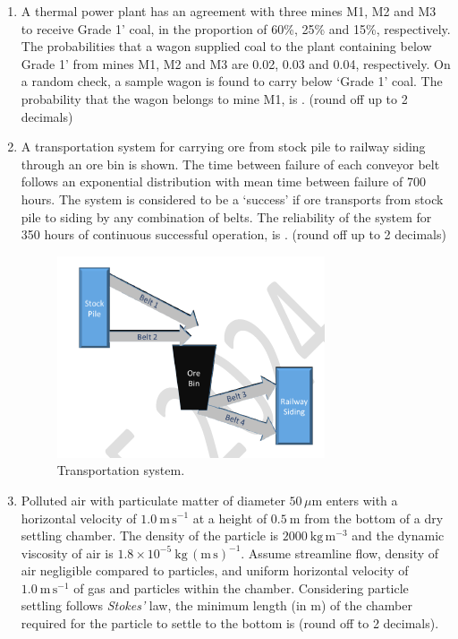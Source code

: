 \documentclass[journal]{IEEEtran}
\begin{document}
\begin{enumerate}[leftmargin=0pt]
\hfill{}
\item A thermal power plant has an agreement with three mines M1, M2 and M3 to receive Grade 1' coal, in the proportion of 60\%, 25\% and 15\%, respectively. The probabilities that a wagon supplied coal to the plant containing below Grade 1' from mines M1, M2 and M3 are 0.02, 0.03 and 0.04, respectively. On a random check, a sample wagon is found to carry below `Grade 1' coal. The probability that the wagon belongs to mine M1, is \underline{\hspace{1.5cm}}. (round off up to 2 decimals)
\hfill{}
\item A transportation system for carrying ore from stock pile to railway siding through an ore bin is shown. The time between failure of each conveyor belt follows an exponential distribution with mean time between failure of 700 hours. The system is considered to be a `success' if ore transports from stock pile to siding by any combination of belts. The reliability of the system for 350 hours of continuous successful operation, is \underline{\hspace{1.5cm}}. (round off up to 2 decimals)
\begin{figure}[h!]
\centering
\includegraphics[width=0.5\linewidth]{figs/transportation.PNG}
\caption{Transportation system.}
\label{fig:transport}
\end{figure}
\hfill{}
\item Polluted air with particulate matter of diameter $50\,\mu\mathrm{m}$ enters with a horizontal velocity of $1.0\ \mathrm{m\,s^{-1}}$ at a height of $0.5\ \mathrm{m}$ from the bottom of a dry settling chamber. The density of the particle is $2000\ \mathrm{kg\,m^{-3}}$ and the dynamic viscosity of air is $1.8\times10^{-5}\ \mathrm{kg\,(m\,s)^{-1}}$. Assume streamline flow, density of air negligible compared to particles, and uniform horizontal velocity of $1.0\ \mathrm{m\,s^{-1}}$ of gas and particles within the chamber. Considering particle settling follows \textit{Stokes'} law, the minimum length (in m) of the chamber required for the particle to settle to the bottom is \underline{\hspace{1.5cm}} (round off to 2 decimals).



\end{enumerate}
\end{document}
